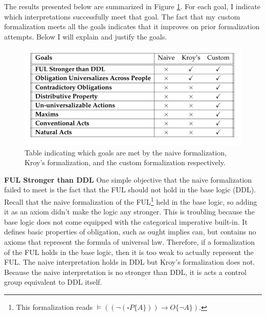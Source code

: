 \begin{isabellebody}
\begin{isamarkuptext}
The results presented below are summarized in Figure \ref{fig:goalstable}. For each goal, I indicate which 
interpretations successfully meet that goal. The fact that my custom formalization meets all the goals
indicates that it improves on prior formalization attempts. Below I will explain and justify
the goals.%
\end{isamarkuptext}\isamarkuptrue%
%
\begin{figure}
\centering
\includegraphics[scale=0.4]{goalstable.png}
\caption{Table indicating which goals are met by the naive formalization, Kroy's formalization, and 
the custom formalization respectively.} \label{fig:goalstable}
\end{figure}
%
\isadelimdocument
%
\endisadelimdocument
%
\isatagdocument
%
\isamarkuptrue%
%
\endisatagdocument
{\isafolddocument}%
%
\isadelimdocument
%
\endisadelimdocument
%
\begin{isamarkuptext}%
\textbf{FUL Stronger than DDL} One simple objective that the naive formalization failed to meet is the fact that the FUL should
not hold in the base logic (DDL). Recall that the naive formalization of the FUL\footnote{
This formalization reads $\vDash ((\neg (\square P \{A\})) \longrightarrow O \{\neg A\})$.} held in the 
base logic, so adding it as an axiom didn't make the logic any stronger. This is troubling 
because the base logic does not come equipped with the categorical imperative built-in. It 
defines basic properties of obligation, such as ought implies can, but contains no axioms that represent
the formula of universal law. Therefore, if a formalization of the FUL holds in the 
base logic, then it is too weak to actually represent the FUL. The naive interpretation holds in DDL but Kroy's formalization
does not. Because the naive interpretation is no stronger than DDL, it is acts a control group equivalent
to DDL itself.

\medskip 


\end{isamarkuptext}
\end{isabellebody}
